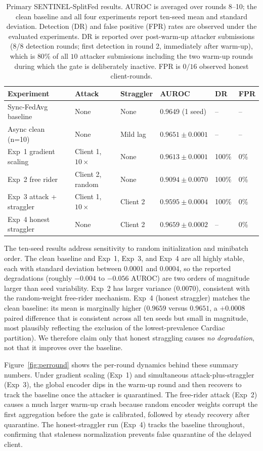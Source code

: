 \documentclass[pdflatex,sn-mathphys-num]{sn-jnl}
\begin{document}
\begin{table}[t]
\caption{Primary SENTINEL-SplitFed results. AUROC is averaged over rounds 8--10; the clean baseline and all four experiments report ten-seed mean and standard deviation. Detection (DR) and false positive (FPR) rates are observed under the evaluated experiments. DR is reported over post-warm-up attacker submissions (8/8 detection rounds; first detection in round 2, immediately after warm-up), which is $80\%$ of all $10$ attacker submissions including the two warm-up rounds during which the gate is deliberately inactive. FPR is $0/16$ observed honest client-rounds.}
\label{tab:main-results}
\centering
\begin{tabular}{llllll}
\toprule
Experiment & Attack & Straggler & AUROC & DR & FPR \\
\midrule
Sync-FedAvg baseline & None & None & 0.9649 (1 seed) & -- & -- \\
Async clean (n=10) & None & Mild lag & $0.9651\pm0.0001$ & -- & -- \\
Exp~1 gradient scaling & Client 1, $10\times$ & None & $0.9613\pm0.0001$ & 100\% & 0\% \\
Exp~2 free rider & Client 2, random & None & $0.9094\pm0.0070$ & 100\% & 0\% \\
Exp~3 attack + straggler & Client 1, $10\times$ & Client 2 & $0.9595\pm0.0004$ & 100\% & 0\% \\
Exp~4 honest straggler & None & Client 2 & $0.9659\pm0.0002$ & -- & 0\% \\
\bottomrule
\end{tabular}
\end{table}

The ten-seed results address sensitivity to random initialization and minibatch order. The clean baseline and Exp~1, Exp~3, and Exp~4 are all highly stable, each with standard deviation between 0.0001 and 0.0004, so the reported degradations (roughly $-0.004$ to $-0.056$ AUROC) are two orders of magnitude larger than seed variability. Exp~2 has larger variance ($0.0070$), consistent with the random-weight free-rider mechanism. Exp~4 (honest straggler) matches the clean baseline: its mean is marginally higher ($0.9659$ versus $0.9651$, a $+0.0008$ paired difference that is consistent across all ten seeds but small in magnitude, most plausibly reflecting the exclusion of the lowest-prevalence Cardiac partition). We therefore claim only that honest straggling causes \emph{no degradation}, not that it improves over the baseline.

Figure~\ref{fig:perround} shows the per-round dynamics behind these summary numbers. Under gradient scaling (Exp~1) and simultaneous attack-plus-straggler (Exp~3), the global encoder dips in the warm-up round and then recovers to track the baseline once the attacker is quarantined. The free-rider attack (Exp~2) causes a much larger warm-up crash because random encoder weights corrupt the first aggregation before the gate is calibrated, followed by steady recovery after quarantine. The honest-straggler run (Exp~4) tracks the baseline throughout, confirming that staleness normalization prevents false quarantine of the delayed client.
\end{document}
